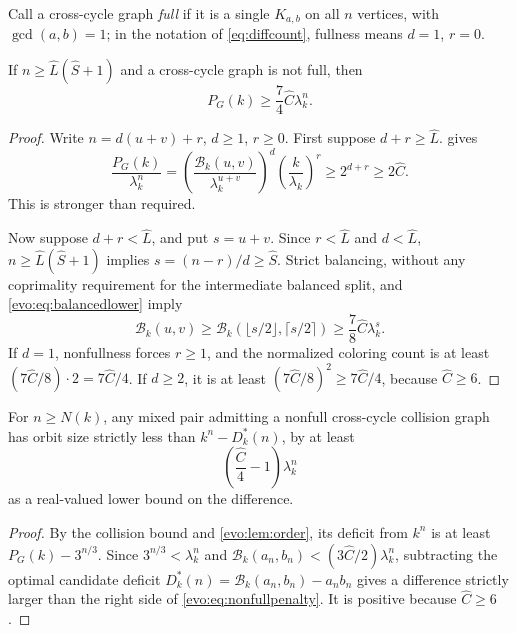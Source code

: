 \documentclass[11pt,a4paper]{article}
\numberwithin{equation}{section}
\theoremstyle{definition}
\theoremstyle{remark}
\newcommand{\Bip}{\mathcal B}
\begin{document}
Call a cross-cycle graph \emph{full} if it is a single $K_{a,b}$ on all $n$
vertices, with $\gcd(a,b)=1$; in the notation of \eqref{eq:diffcount},
fullness means $d=1$, $r=0$.

\begin{lemma}\label{evo:lem:badcross}
If $n\ge\hat L(\hat S+1)$ and a cross-cycle graph is not full, then
\begin{equation}\label{evo:eq:badcross}
 P_G(k)\ge\frac74\hat C\lambda_k^n.
\end{equation}
\end{lemma}
\begin{proof}
Write $n=d(u+v)+r$, $d\ge1$, $r\ge0$. First suppose $d+r\ge\hat L$.
 gives
\[
 \frac{P_G(k)}{\lambda_k^n}
 =\left(\frac{\Bip_k(u,v)}{\lambda_k^{u+v}}\right)^d
     \left(\frac{k}{\lambda_k}\right)^r
 \ge2^{d+r}\ge2\hat C.
\]
This is stronger than required.

Now suppose $d+r<\hat L$, and put $s=u+v$. Since $r<\hat L$ and $d<\hat L$,
$n\ge\hat L(\hat S+1)$ implies $s=(n-r)/d\ge\hat S$. Strict balancing, without
any coprimality requirement for the intermediate balanced split, and
\eqref{evo:eq:balancedlower} imply
\[
 \Bip_k(u,v)\ge\Bip_k(\lfloor s/2\rfloor,\lceil s/2\rceil)
          \ge\frac78\hat C\lambda_k^s.
\]
If $d=1$, nonfullness forces $r\ge1$, and the normalized coloring count is at
least $(7\hat C/8)\cdot2=7\hat C/4$. If $d\ge2$, it is at least
$(7\hat C/8)^2\ge7\hat C/4$, because $\hat C\ge6$.
\end{proof}

\begin{corollary}\label{evo:cor:nonfullgap}
For $n\ge N(k)$, any mixed pair admitting a nonfull cross-cycle collision
graph has orbit size strictly less than $k^n-D^*_k(n)$, by at least
\begin{equation}\label{evo:eq:nonfullpenalty}
 \left(\frac{\hat C}4-1\right)\lambda_k^n
\end{equation}
as a real-valued lower bound on the difference.
\end{corollary}
\begin{proof}
By the collision bound and \cref{evo:lem:order}, its deficit from $k^n$ is at
least $P_G(k)-3^{n/3}$. Since $3^{n/3}<\lambda_k^n$ and
$\Bip_k(a_n,b_n)<(3\hat C/2)\lambda_k^n$, subtracting the optimal candidate
deficit $D^*_k(n)=\Bip_k(a_n,b_n)-a_nb_n$ gives a difference strictly larger
than the right side of \eqref{evo:eq:nonfullpenalty}. It is positive because
$\hat C\ge6$.
\end{proof}
\end{document}
